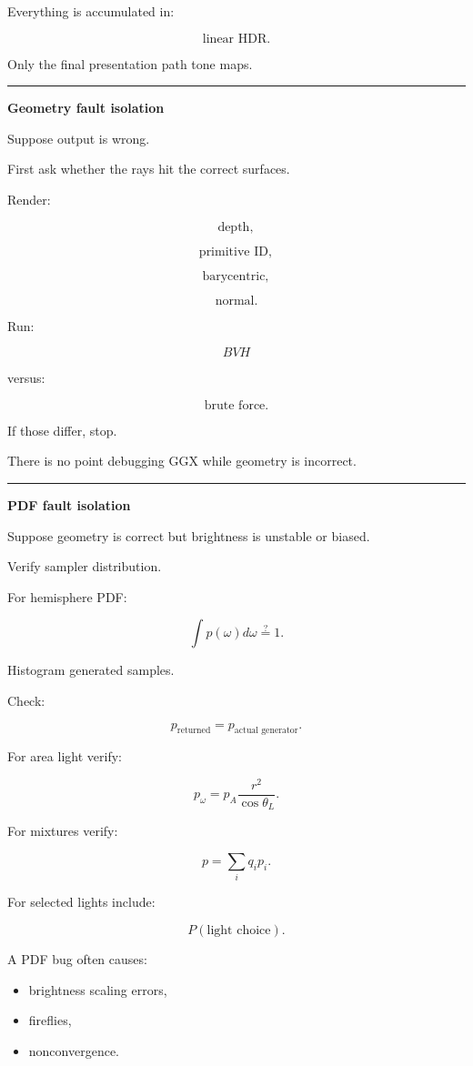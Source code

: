 Everything is accumulated in:

\[
\boxed{\text{linear HDR}.}
\]

Only the final presentation path tone maps.

\begin{center}\rule{0.5\linewidth}{0.5pt}\end{center}

\textbf{Geometry fault isolation}

Suppose output is wrong.

First ask whether the rays hit the correct surfaces.

Render:

\[
\text{depth},
\]

\[
\text{primitive ID},
\]

\[
\text{barycentric},
\]

\[
\text{normal}.
\]

Run:

\[
BVH
\]

versus:

\[
\text{brute force}.
\]

If those differ, stop.

There is no point debugging GGX while geometry is incorrect.

\begin{center}\rule{0.5\linewidth}{0.5pt}\end{center}

\textbf{PDF fault isolation}

Suppose geometry is correct but brightness is unstable or biased.

Verify sampler distribution.

For hemisphere PDF:

\[
\int p(\omega)d\omega
\stackrel{?}{=}1.
\]

Histogram generated samples.

Check:

\[
p_{\text{returned}}
=
p_{\text{actual generator}}.
\]

For area light verify:

\[
p_\omega=
p_A\frac{r^2}{\cos\theta_L}.
\]

For mixtures verify:

\[
p=
\sum_i q_i p_i.
\]

For selected lights include:

\[
P(\text{light choice}).
\]

A PDF bug often causes:

\begin{itemize}
\tightlist
\item
  brightness scaling errors,
\item
  fireflies,
\item
  nonconvergence.
\end{itemize}

